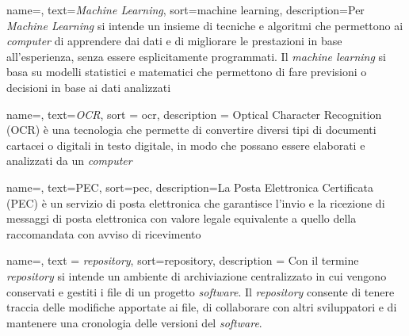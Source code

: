 
 {
    name=,
    text=\emph{Machine Learning},
    sort=machine learning,
    description={Per \emph{Machine Learning} si intende un insieme di tecniche e algoritmi che permettono ai \emph{computer} di apprendere dai dati e di migliorare le prestazioni in base all'esperienza, senza essere esplicitamente programmati. Il \emph{machine learning} si basa su modelli statistici e matematici che permettono di fare previsioni o decisioni in base ai dati analizzati}
}


 {
    name=,
    text=\emph{OCR},
    sort = ocr,
    description = {Optical Character Recognition (OCR) è
    una tecnologia che permette di convertire diversi tipi di documenti cartacei o digitali in testo digitale, in modo che possano essere elaborati e analizzati da un \emph{computer}}
}

 {
    name=,
    text=PEC,
    sort=pec,
    description={La Posta Elettronica Certificata (PEC) è un servizio di posta elettronica che garantisce l'invio e la ricezione di messaggi di posta elettronica con valore legale equivalente a quello della raccomandata con avviso di ricevimento}
}

 {
    name=,
    text = \emph{repository},
    sort=repository,
    description = {Con il termine \emph{repository} si intende un ambiente di archiviazione centralizzato in cui vengono conservati e gestiti i file di un progetto \emph{software}. Il \emph{repository} consente di tenere traccia delle modifiche apportate ai file, di collaborare con altri sviluppatori e di mantenere una cronologia delle versioni del \emph{software}.
    }
}


